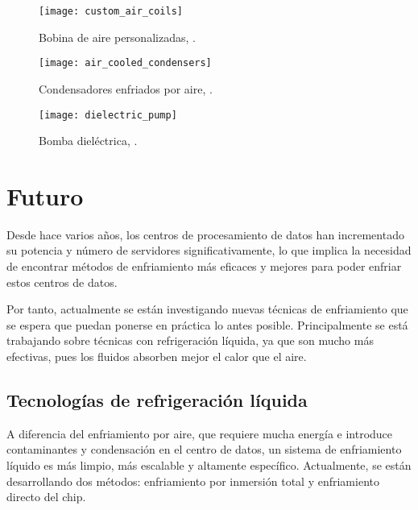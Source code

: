 \begin{figure}
    \begin{center}
        \texttt{[image: custom\_air\_coils]}
        \caption{Bobina de aire personalizadas, \cite{Kelvion}.}
        \label{custom_air_coils}
    \end{center}
\end{figure}

\begin{figure}
    \begin{center}
        \texttt{[image: air\_cooled\_condensers]}
        \caption{Condensadores enfriados por aire, \cite{Kelvion}.}
        \label{air_cooled_condensers}
    \end{center}
\end{figure}

\begin{figure}
    \begin{center}
        \texttt{[image: dielectric\_pump]}
        \caption{Bomba dieléctrica, \cite{Kelvion}.}
        \label{dielectric_pump}
    \end{center}
\end{figure}

\section{Futuro} \label{futuro}

Desde hace varios años, los centros de procesamiento de datos han incrementado su potencia y número de servidores significativamente, lo que implica la necesidad de encontrar métodos de enfriamiento más eficaces y mejores para poder enfriar estos centros de datos.

Por tanto, actualmente se están investigando nuevas técnicas de enfriamiento que se espera que puedan ponerse en práctica lo antes posible. Principalmente se está trabajando sobre técnicas con refrigeración líquida, ya que son mucho más efectivas, pues los fluidos absorben mejor el calor que el aire.

\subsection{Tecnologías de refrigeración líquida}

A diferencia del enfriamiento por aire, que requiere mucha energía e introduce contaminantes y condensación en el centro de datos, un sistema de enfriamiento líquido es más limpio, más escalable y altamente específico. Actualmente, se están desarrollando dos métodos: enfriamiento por inmersión total y enfriamiento directo del chip.

